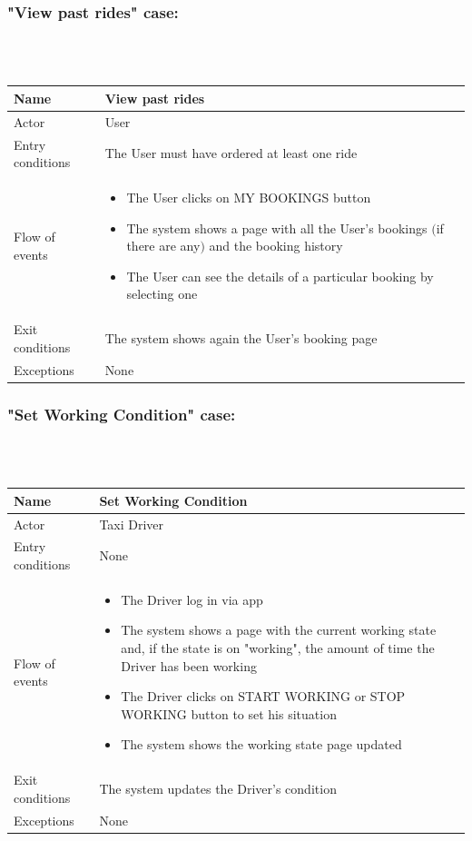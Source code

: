 \newpage
\subsubsection{"View past rides" case:}
\hfill \\
\\
\begin{tabular}{|p{3cm}|p{10cm}|}
\hline
Name & View past rides\\
\hline
Actor & User\\
\hline
Entry conditions & The User must have ordered at least one ride\\
\hline
Flow of events &
	\begin{itemize}
		\item The User clicks on MY BOOKINGS button
		\item The system shows a page with all the User's bookings $($if there are any$)$ and the booking history
		\item The User can see the details of a particular booking by selecting one
	\end{itemize}\\

\hline
Exit conditions & The system shows again the User's booking page\\
\hline
Exceptions & None\\
\hline
\end {tabular}

\newpage
\subsubsection{"Set Working Condition" case:}
\hfill \\
\\
\begin {tabular}{|p{3cm}|p{10cm}|}
\hline
Name & Set Working Condition\\
\hline
Actor & Taxi Driver\\
\hline
Entry conditions & None\\
\hline
Flow of events &
	\begin {itemize}
		\item The Driver log in via app
		\item The system shows a page with the current working state and, if the state is on "working", the amount of time the Driver has been working
		\item The Driver clicks on START WORKING or STOP WORKING button to set his situation
		\item The system shows the working state page updated
	\end {itemize}\\

\hline
Exit conditions & The system updates the Driver's condition\\
\hline
Exceptions & None\\
\hline
\end {tabular}



